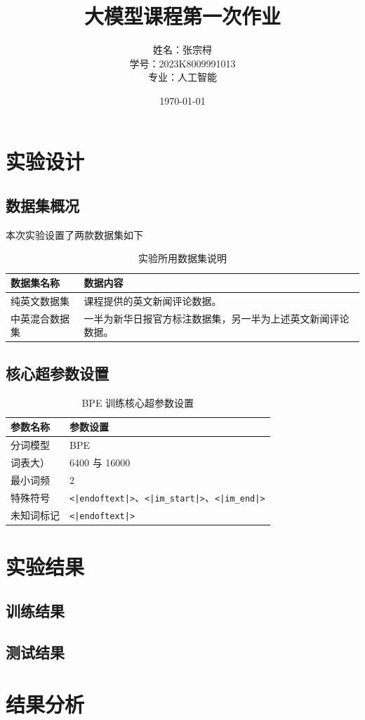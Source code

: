 \documentclass[a4paper,12pt]{ctexart} %
\title{\textbf{大模型课程第一次作业}}
\author{姓名：张宗桪 \\ 学号：2023K8009991013 \\ 专业：人工智能}
\date{\today}
\begin{document}
\pagestyle{plain} %

\maketitle
\thispagestyle{empty} %
\newpage

\tableofcontents
\newpage
\section{实验设计}


\subsection{数据集概况}
本次实验设置了两款数据集如下

\begin{table}[H]
    \centering
    \caption{实验所用数据集说明}
    \begin{tabular}{p{} p{}}
        \toprule
        数据集名称 & 数据内容 \\
        \midrule
        纯英文数据集 & 课程提供的英文新闻评论数据。 \\
        中英混合数据集 & 一半为新华日报官方标注数据集，另一半为上述英文新闻评论数据。 \\
        \bottomrule
    \end{tabular}
\end{table}

\subsection{核心超参数设置}

\begin{table}[H]
    \centering
    \caption{BPE 训练核心超参数设置}
    \begin{tabular}{p{} p{}}
        \toprule
        参数名称 & 参数设置 \\
        \midrule
        分词模型 & BPE \\
        词表大） & 6400 与 16000 \\
        最小词频 & 2 \\
        特殊符号 & \texttt{<|endoftext|>}、\texttt{<|im\_start|>}、\texttt{<|im\_end|>} \\
        未知词标记 & \texttt{<|endoftext|>} \\

        \bottomrule
    \end{tabular}
\end{table}


\section{实验结果}


\subsection{训练结果}


\subsection{测试结果}


\section{结果分析}
\end{document}
